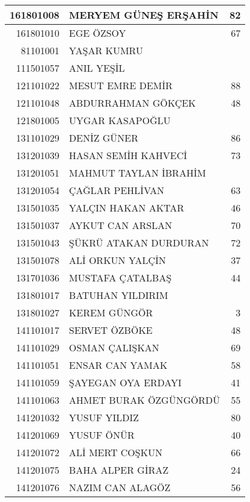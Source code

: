 \documentclass[12pt]{article}
\begin{document}
\begin{multicols}{2}
\begin{longtable}{||r||l||r||}
    161801008 & MERYEM GÜNEŞ ERŞAHİN & 82 \\
    \midrule
    161801010 & EGE ÖZSOY & 67 \\
    \midrule
    81101001 & YAŞAR KUMRU &  \\
    \midrule
    111501057 & ANIL YEŞİL &  \\
    \midrule
    121101022 & MESUT EMRE DEMİR & 88 \\
    \midrule
    121101048 & ABDURRAHMAN GÖKÇEK & 48 \\
    \midrule
    121801005 & UYGAR KASAPOĞLU &  \\
    \midrule
    131101029 & DENİZ GÜNER & \cellcolor[rgb]{ 1,  1,  0} 86 \\
    \midrule
    131201039 & HASAN SEMİH KAHVECİ & 73 \\
    \midrule
    131201051 & MAHMUT TAYLAN İBRAHİM &  \\
    \midrule
    131201054 & ÇAĞLAR PEHLİVAN & 63 \\
    \midrule
    131501035 & YALÇIN HAKAN AKTAR & 46 \\
    \midrule
    131501037 & AYKUT CAN ARSLAN & 70 \\
    \midrule
    131501043 & ŞÜKRÜ ATAKAN DURDURAN & 72 \\
    \midrule
    131501078 & ALİ ORKUN YALÇİN & 37 \\
    \midrule
    131701036 & MUSTAFA ÇATALBAŞ & 44 \\
    \midrule
    131801017 & BATUHAN YILDIRIM &  \\
    \midrule
    131801027 & KEREM GÜNGÖR & 3 \\
    \midrule
    141101017 & SERVET ÖZBÖKE & 48 \\
    \midrule
    141101029 & OSMAN ÇALIŞKAN & 69 \\
    \midrule
    141101051 & ENSAR CAN YAMAK & 58 \\
    \midrule
    141101059 & ŞAYEGAN OYA ERDAYI & 41 \\
    \midrule
    141101063 & AHMET BURAK ÖZGÜNGÖRDÜ & 55 \\
    \midrule
    141201032 & YUSUF YILDIZ & \cellcolor[rgb]{ 1,  1,  0} 80 \\
    \midrule
    141201069 & YUSUF ÖNÜR & 40 \\
    \midrule
    141201072 & ALİ MERT COŞKUN & 66 \\
    \midrule
    141201075 & BAHA ALPER GİRAZ & 24 \\
    \midrule
    141201076 & NAZIM CAN ALAGÖZ & 56 \\

\end{longtable}
\end{multicols}
\end{document}
